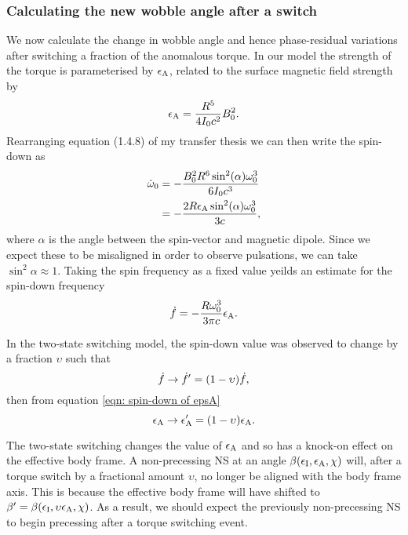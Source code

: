 \documentclass[../full_thesis/full_thesis.tex]{subfiles}
\begin{document}
\subsubsection{Calculating the new wobble angle after a switch}
We now calculate the change in wobble angle and hence phase-residual variations
after switching a fraction of the anomalous torque.
In our model the strength of the torque is parameterised
by $\epsilon_{\mathrm{A}}$, related to the surface magnetic field strength by 
\begin{align}
    \epsilon_{\mathrm{A}} = \frac{R^{5}}{4I_{0} c^{2}} B_{0}^{2}.
\end{align}
Rearranging equation (1.4.8) of my transfer thesis we can then write the 
spin-down as 
\begin{align}
    \dot{\omega}_{0} & = -\frac{B_{0}^{2}R^{6} \sin^{2}(\alpha) \omega_{0}^{3}}{6 I_{0} c^{3}} \\
    & = - \frac{2 R \epsilon_{\mathrm{A}} \sin^{2}(\alpha) \omega_{0}^{3}}{3 c},
\end{align}
where $\alpha$ is the angle between the spin-vector and magnetic dipole. Since
we expect these to be misaligned in order to observe pulsations, we can take
$\sin^{2}\alpha \approx 1$.
Taking the spin frequency as a fixed value yeilds an estimate for the
spin-down frequency
\begin{equation}
    \dot{f} = - \frac{R\omega_{0}^{3}}{3\pi c}\epsilon_{\mathrm{A}}.
    \label{eqn: spin-down of epsA}
\end{equation}

In the two-state switching model, the spin-down value was observed to change
by a fraction $\upsilon$ such that
\begin{equation}
    \dot{f} \rightarrow \dot{f}' = (1-\upsilon)\dot{f},
\end{equation}
then from equation \eqref{eqn: spin-down of epsA} 
\begin{equation}
    \epsilon_{\mathrm{A}} \rightarrow \epsilon_{\mathrm{A}}' = (1-\upsilon)\epsilon_{\mathrm{A}}.
\end{equation}

The two-state switching changes the value of $\epsilon_{\mathrm{A}}$ and so has a knock-on 
effect on the effective body frame. A non-precessing NS at an
angle $\beta(\epsilon_{\mathrm{I}}, \epsilon_{\mathrm{A}}, \chi)$ will, after a torque switch by a fractional
amount $\upsilon$, no longer be aligned with the body frame axis. This is 
because the effective body frame will have shifted to 
$\beta' = \beta(\epsilon_{\mathrm{I}}, \upsilon\epsilon_{\mathrm{A}}, \chi)$. As a result, we should expect the
previously non-precessing NS to begin precessing after a torque switching event. 
\end{document}
